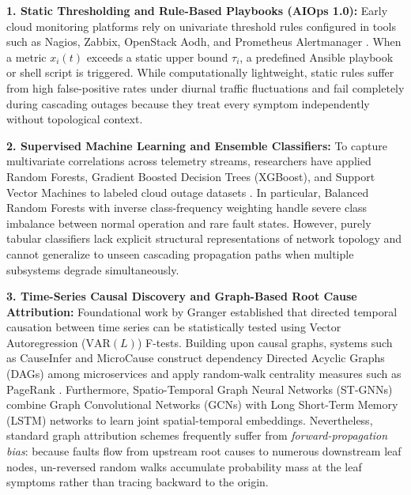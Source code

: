 \textbf{1. Static Thresholding and Rule-Based Playbooks (AIOps 1.0):} Early cloud monitoring platforms rely on univariate threshold rules configured in tools such as Nagios, Zabbix, OpenStack Aodh, and Prometheus Alertmanager \cite{kolla2023, prometheus2022}. When a metric $x_i(t)$ exceeds a static upper bound $\tau_i$, a predefined Ansible playbook or shell script is triggered. While computationally lightweight, static rules suffer from high false-positive rates under diurnal traffic fluctuations and fail completely during cascading outages because they treat every symptom independently without topological context.

\textbf{2. Supervised Machine Learning and Ensemble Classifiers:} To capture multivariate correlations across telemetry streams, researchers have applied Random Forests, Gradient Boosted Decision Trees (XGBoost), and Support Vector Machines to labeled cloud outage datasets \cite{breiman2001, chen2016}. In particular, Balanced Random Forests with inverse class-frequency weighting handle severe class imbalance between normal operation and rare fault states. However, purely tabular classifiers lack explicit structural representations of network topology and cannot generalize to unseen cascading propagation paths when multiple subsystems degrade simultaneously.

\textbf{3. Time-Series Causal Discovery and Graph-Based Root Cause Attribution:} Foundational work by Granger \cite{granger1969} established that directed temporal causation between time series can be statistically tested using Vector Autoregression ($\text{VAR}(L)$) F-tests. Building upon causal graphs, systems such as CauseInfer \cite{chen2014causeinfer} and MicroCause \cite{meng2020microcause} construct dependency Directed Acyclic Graphs (DAGs) among microservices and apply random-walk centrality measures such as PageRank \cite{page1999pagerank}. Furthermore, Spatio-Temporal Graph Neural Networks (ST-GNNs) \cite{kipf2017gcn, yu2018stgcn} combine Graph Convolutional Networks (GCNs) with Long Short-Term Memory (LSTM) networks \cite{hochreiter1997lstm} to learn joint spatial-temporal embeddings. Nevertheless, standard graph attribution schemes frequently suffer from \textit{forward-propagation bias}: because faults flow from upstream root causes to numerous downstream leaf nodes, un-reversed random walks accumulate probability mass at the leaf symptoms rather than tracing backward to the origin.


